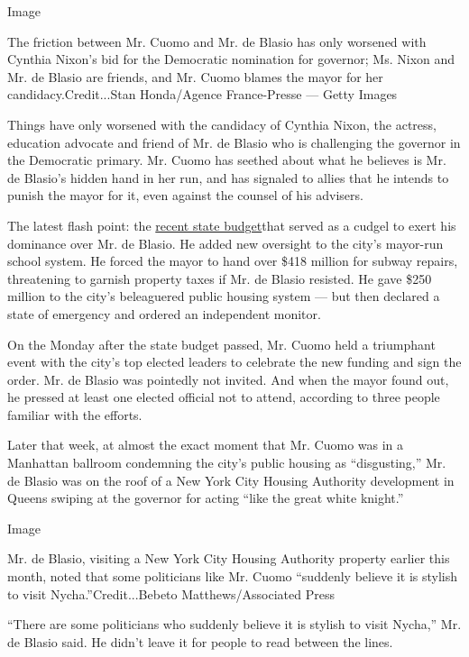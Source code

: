 Image

The friction between Mr. Cuomo and Mr. de Blasio has only worsened with
Cynthia Nixon's bid for the Democratic nomination for governor; Ms.
Nixon and Mr. de Blasio are friends, and Mr. Cuomo blames the mayor for
her candidacy.Credit...Stan Honda/Agence France-Presse --- Getty Images

Things have only worsened with the candidacy of Cynthia Nixon, the
actress, education advocate and friend of Mr. de Blasio who is
challenging the governor in the Democratic primary. Mr. Cuomo has
seethed about what he believes is Mr. de Blasio's hidden hand in her
run, and has signaled to allies that he intends to punish the mayor for
it, even against the counsel of his advisers.

The latest flash point: the
\href{https://www.nytimes3xbfgragh.onion/2018/03/31/nyregion/new-york-city-budget-cuomo.html}{recent
state budget}that served as a cudgel to exert his dominance over Mr. de
Blasio. He added new oversight to the city's mayor-run school system. He
forced the mayor to hand over \$418 million for subway repairs,
threatening to garnish property taxes if Mr. de Blasio resisted. He gave
\$250 million to the city's beleaguered public housing system --- but
then declared a state of emergency and ordered an independent monitor.

On the Monday after the state budget passed, Mr. Cuomo held a triumphant
event with the city's top elected leaders to celebrate the new funding
and sign the order. Mr. de Blasio was pointedly not invited. And when
the mayor found out, he pressed at least one elected official not to
attend, according to three people familiar with the efforts.

Later that week, at almost the exact moment that Mr. Cuomo was in a
Manhattan ballroom condemning the city's public housing as
``disgusting,'' Mr. de Blasio was on the roof of a New York City Housing
Authority development in Queens swiping at the governor for acting
``like the great white knight.''

Image

Mr. de Blasio, visiting a New York City Housing Authority property
earlier this month, noted that some politicians like Mr. Cuomo
``suddenly believe it is stylish to visit Nycha.''Credit...Bebeto
Matthews/Associated Press

``There are some politicians who suddenly believe it is stylish to visit
Nycha,'' Mr. de Blasio said. He didn't leave it for people to read
between the lines.

